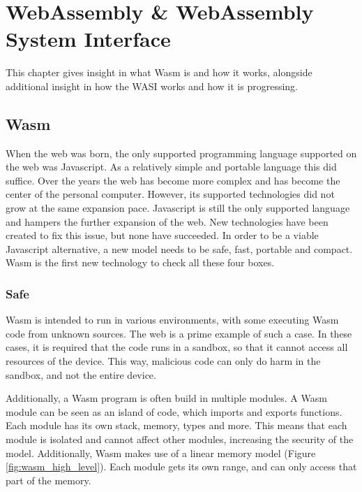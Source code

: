 \chapter{WebAssembly {\&} WebAssembly System Interface}
This chapter gives insight in what \acrfull{Wasm} is and how it works, alongside additional insight in how the \acrfull{WASI} works and how it is progressing.

\section{\acrshort{Wasm}}

When the web was born, the only supported programming language supported on the web was Javascript. As a relatively simple and portable language this did suffice. Over the years the web has become more complex and has become the center of the personal computer. However, its supported technologies did not grow at the same expansion pace. Javascript is still the only supported language and hampers the further expansion of the web. New technologies have been created to fix this issue, but none have succeeded. 
In order to be a viable Javascript alternative, a new model needs to be safe, fast, portable and compact. \acrshort{Wasm} is the first new technology to check all these four boxes. \cite{bringing_the_web_up_to_speed}

\subsection{Safe}
Wasm is intended to run in various environments, with some executing Wasm code from unknown sources. The web is a prime example of such a case. In these cases, it is required that the code runs in a sandbox, so that it cannot access all resources of the device. This way, malicious code can only do harm in the sandbox, and not the entire device.

Additionally, a Wasm program is often build in multiple modules. A Wasm module can be seen as an island of code, which imports and exports functions. Each module has its own stack, memory, types and more. This means that each module is isolated and cannot affect other modules, increasing the security of the model. Additionally, Wasm makes use of a linear memory model (Figure \ref{fig:wasm_high_level}). Each module gets its own range, and can only access that part of the memory.

